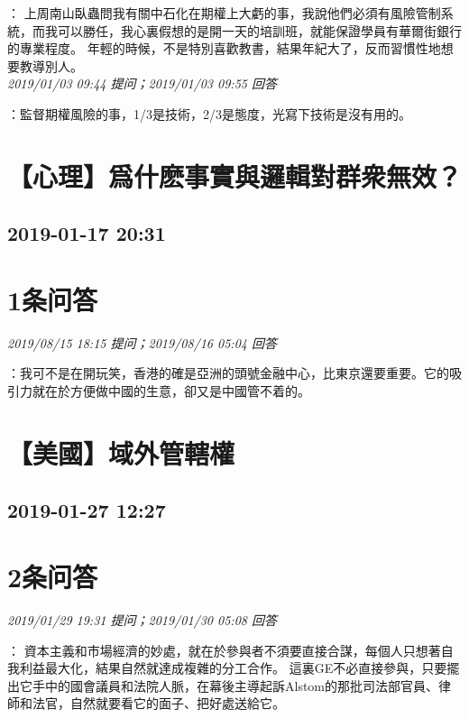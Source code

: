 \documentclass[twocolumn]{ctexart}
\begin{document}
：
上周南山臥蟲問我有關中石化在期權上大虧的事，我說他們必須有風險管制系統，而我可以勝任，我心裏假想的是開一天的培訓班，就能保證學員有華爾街銀行的專業程度。
年輕的時候，不是特別喜歡教書，結果年紀大了，反而習慣性地想要教導別人。
\\

\textit{\hfill\noindent\small 2019/01/03 09:44 提问；2019/01/03 09:55 回答}

：監督期權風險的事，1/3是技術，2/3是態度，光寫下技術是沒有用的。
\\


\section{【心理】爲什麽事實與邏輯對群衆無效？}
\subsection{2019-01-17 20:31}


\section{1条问答}

\textit{\hfill\noindent\small 2019/08/15 18:15 提问；2019/08/16 05:04 回答}

：我可不是在開玩笑，香港的確是亞洲的頭號金融中心，比東京還要重要。它的吸引力就在於方便做中國的生意，卻又是中國管不着的。
\\


\section{【美國】域外管轄權}
\subsection{2019-01-27 12:27}


\section{2条问答}

\textit{\hfill\noindent\small 2019/01/29 19:31 提问；2019/01/30 05:08 回答}

：
資本主義和市場經濟的妙處，就在於參與者不須要直接合謀，每個人只想著自我利益最大化，結果自然就達成複雜的分工合作。
這裏GE不必直接參與，只要擺出它手中的國會議員和法院人脈，在幕後主導起訴Alstom的那批司法部官員、律師和法官，自然就要看它的面子、把好處送給它。
\\
\end{document}
